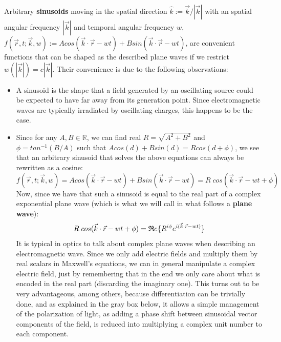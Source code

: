 \documentclass[11pt, a4paper, twoside]{article} %
\newcommand{\R}{\mathbb{R}} %
\begin{document}

Arbitrary {\bf sinusoids} moving in the spatial direction $\hat{k}:=\vec{k}/|\vec{k}|$ with an spatial angular frequency $|\vec{k}|$ and temporal angular frequency $w$, $f(\vec{r},t;\vec{k},w):=Acos(\vec{k}\cdot \vec{r}-wt)+Bsin(\vec{k}\cdot \vec{r}-wt)$, are convenient functions that can be shaped as the described plane waves if we restrict $w(|\vec{k}|)=c|\vec{k}|$. Their convenience is due to the following observations:\vspace{-0.2cm}
\begin{itemize}
\item A sinusoid is the shape that a field generated by an oscillating source could be expected to have far away from its generation point. Since electromagnetic waves are typically irradiated by oscillating charges, this happens to be the case.

\item Since for any $A,B\in\R$, we can find real $R=\sqrt{A^2+B^2}$ and $\phi=tan^{-1}(B/A)$ such that $Acos(d)+Bsin(d)=Rcos(d+\phi)$, we see that an arbitrary sinusoid that solves the above equations can always be rewritten as a cosine:
\begin{equation}
f(\vec{r},t;\vec{k},w)=Acos(\vec{k}\cdot \vec{r}-wt)+Bsin(\vec{k}\cdot \vec{r}-wt)=R\;cos(\vec{k}\cdot \vec{r}-wt+\phi)
\end{equation}
Now, since we have that such a sinusoid is equal to the real part of a complex exponential plane wave (which is what we will call in what follows a {\bf plane wave}):\vspace{-0.2cm}
\begin{equation}
R\;cos(\vec{k}\cdot \vec{r}-wt+\phi)=\mathfrak{R}e\{R^{i\phi}e^{i(\vec{k}\cdot \vec{r}-wt)}\}\vspace{-0.2cm}
\end{equation}
It is typical in optics to talk about complex plane waves when describing an electromagnetic wave. Since we only add electric fields and multiply them by real scalars in Maxwell's equations, we can in general manipulate a complex electric field, just by remembering that in the end we only care about what is encoded in the real part (discarding the imaginary one). This turns out to be very advantageous, among others, because differentiation can be trivially done, and as explained in the gray box below, it allows a simple management of the polarization of light, as adding a phase shift between sinusoidal vector components of the field, is reduced into multiplying a complex unit number to each component.


\end{itemize}
\end{document}
